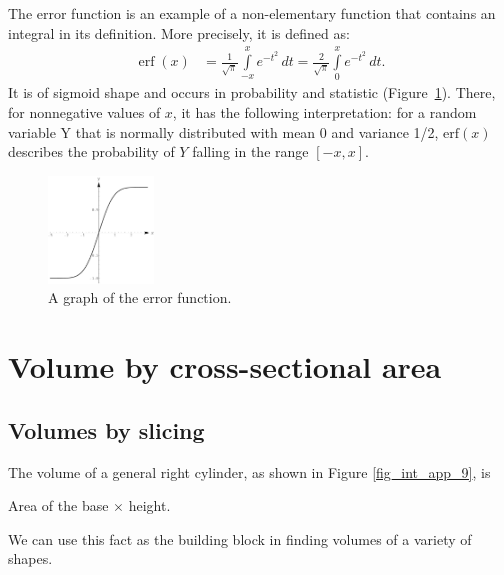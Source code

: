 \begin{example}
\end{example}

\begin{remark}
The error function is an example of a non-elementary function that contains an integral in its definition.  More precisely,  it is defined as:
$$
\displaystyle {\begin{aligned}\operatorname {erf} (x)&={\frac {1}{\sqrt {\pi }}}\int\limits _{-x}^{x}e^{-t^{2}}\,dt={\frac {2}{\sqrt {\pi }}}\int\limits _{0}^{x}e^{-t^{2}}\,dt.\end{aligned}}
$$
It is of sigmoid shape and  occurs in probability and statistic (Figure~\ref{fig_int_app_8}). There, for nonnegative values of $x$, it has the following interpretation: for a random variable Y that is normally distributed with mean 0 and variance 1/2, $\text{erf}(x)$ describes the probability of $Y$ falling in the range $[-x, x]$. 

\begin{figure}[H]
	\begin{center}
			\includegraphics[width=0.25\textwidth]{fig_int_app_8}
	\caption{A graph of the error function.}
	\label{fig_int_app_8}
	\end{center}
\end{figure}


\end{remark}

\section{Volume by cross-sectional area}\label{sec:disk}

\subsection{Volumes by slicing}
The volume of a general right cylinder, as shown in Figure \ref{fig_int_app_9}, is 

\hfill Area of the base $\times$ height. \hfill\null

We can use this fact as the building block in finding volumes of a variety of shapes.


